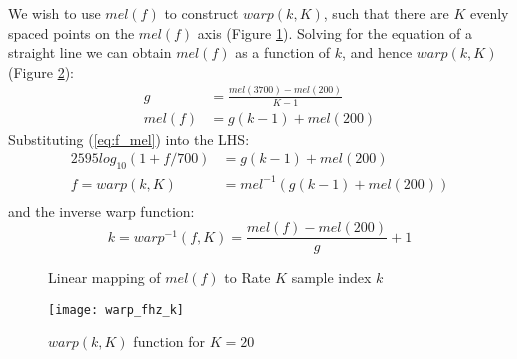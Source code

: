 \documentclass{article}
\begin{document}
We wish to use $mel(f)$ to construct $warp(k,K)$, such that there are $K$ evenly spaced points on the $mel(f)$ axis (Figure \ref{fig:mel_k}).  Solving for the equation of a straight line we can obtain $mel(f)$ as a function of $k$, and hence $warp(k,K)$ (Figure \ref{fig:warp_fhz_k}):
\begin{equation} \label{eq:mel_k}
\begin{split}
g &= \frac{mel(3700)-mel(200)}{K-1} \\
mel(f) &= g(k-1) + mel(200)
\end{split}
\end{equation}
Substituting (\ref{eq:f_mel}) into the LHS:
\begin{equation} \label{eq:warp}
\begin{split}
2595log_{10}(1+f/700) &= g(k-1) + mel(200) \\
f = warp(k,K) &= mel^{-1} ( g(k-1) + mel(200) ) \\
\end{split}
\end{equation}
and the inverse warp function:
\begin{equation} \label{warp_inv}
k = warp^{-1}(f,K) = \frac{mel(f)-mel(200)}{g} + 1
\end{equation}

\begin{figure}[h]
\caption{Linear mapping of $mel(f)$ to Rate $K$ sample index $k$}
\vspace{5mm}
\label{fig:mel_k}
\centering
{}
\end{figure}

\begin{figure}[h]
\caption{$warp(k,K)$ function for $K=20$}
\label{fig:warp_fhz_k}
\begin{center}
\texttt{[image: warp\_fhz\_k]}
\end{center}
\end{figure}
\end{document}
